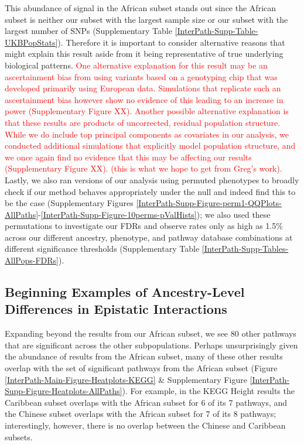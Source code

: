 \documentclass[12pt,a4paper]{article}
\begin{document}
This abundance of signal in the African subset stands out since the African subset is neither our subset with the largest sample size or our subset with the largest number of SNPs (Supplementary Table \ref{InterPath-Supp-Table-UKBPopStats}). Therefore it is important to consider alternative reasons that might explain this result aside from it being representative of true underlying biological patterns. \textcolor{red}{One alternative explanation for this result may be an ascertainment bias from using variants based on a genotyping chip that was developed primarily using European data. Simulations that replicate such an ascertainment bias however show no evidence of this leading to an increase in power (Supplementary Figure XX). Another possible alternative explanation is that these results are products of uncorrected, residual population structure. While we do include top principal components as covariates in our analysis, we conducted additional simulations that explicitly model population structure, and we once again find no evidence that this may be affecting our results (Supplementary Figure XX). (this is what we hope to get from Greg's work).} Lastly, we also ran versions of our analysis using permuted phenotypes to broadly check if our method behaves appropriately under the null and indeed find this to be the case (Supplementary Figures \ref{InterPath-Supp-Figure-perm1-QQPlots-AllPaths}-\ref{InterPath-Supp-Figure-10perms-pValHists}); we also used these permutations to investigate our FDRs and observe rates only as high as 1.5\% across our different ancestry, phenotype, and pathway database combinations at different significance thresholds (Supplementary Table \ref{InterPath-Supp-Tables-AllPops-FDRs}).

\subsection{Beginning Examples of Ancestry-Level Differences in Epistatic Interactions}

Expanding beyond the results from our African subset, we see 80 other pathways that are significant across the other subpopulations. Perhaps unsurprisingly given the abundance of results from the African subset, many of these other results overlap with the set of significant pathways from the African subset (Figure \ref{InterPath-Main-Figure-Heatplots-KEGG} \& Supplementary Figure \ref{InterPath-Supp-Figure-Heatplots-AllPaths}). For example, in the KEGG Height results the Caribbean subset overlaps with the African subset for 6 of its 7 pathways, and the Chinese subset overlaps with the African subset for 7 of its 8 pathways; interestingly, however, there is no overlap between the Chinese and Caribbean subsets. 
\end{document}
